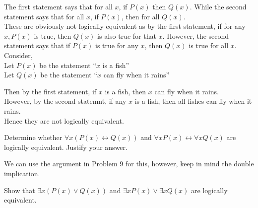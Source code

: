 \documentclass[addpoints]{exam}
\newenvironment{problem}[2][Problem]{\begin{trivlist}
    \item[\hskip \labelsep {\bfseries #1}\hskip \labelsep {\bfseries #2.}]}{\end{trivlist}}
\begin{document}
\begin{sloppypar}
\begin{questions}
    \question
    \begin{solution}

        The first statement says that for all $x$, if $ P(x) $ then $ Q(x) $. While the second statement says that for all $x$, if $ P(x) $, then for all $Q(x)$. \\ 
        These are obviously not logically equivalent as by the first statement, if for any $x, P(x)$ is true, then $ Q(x) $ is also true for that $x$. However, the second statement says that if $ P(x) $ is true for any $x$, then $ Q(x) $ is true for all $x$. \\ 
        Consider, \\ 
        Let $ P(x) $ be the statement ``$x$ is a fish'' \\ 
        Let $ Q(x) $ be the statement ``$x$ can fly when it rains'' 
        
        Then by the first statement, if $x$ is a fish, then $x$ can fly when it rains. \\ 
        However, by the second statemnt, if any $x$ is a fish, then all fishes can fly when it rains. \\ 
        Hence they are not logically equivalent.
    \end{solution}
\end{questions}

\begin{problem}{10}
Determine whether $\forall x (P(x) \leftrightarrow Q(x))$ and $\forall x P(x) \leftrightarrow \forall x Q(x)$ are logically equivalent. Justify your answer.
\end{problem}

\begin{questions}
    \question
    \begin{solution}
        
        We can use the argument in Problem 9 for this, however, keep in mind the double implication.
    \end{solution}
\end{questions}

\begin{problem}{11}
Show that  $\exists x (P(x) \lor Q(x))$ and $\exists x P(x) \lor \exists x Q(x)$ are logically equivalent.
\end{problem}

\begin{questions}
    \question
    \begin{solution}


\end{solution}
\end{questions}
\end{sloppypar}
\end{document}
